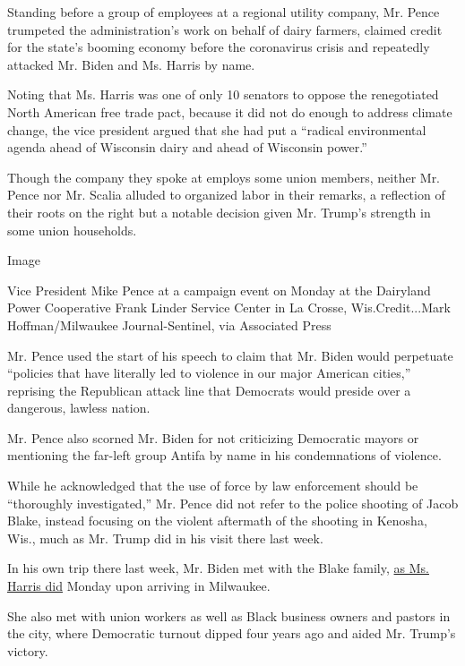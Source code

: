 Standing before a group of employees at a regional utility company, Mr.
Pence trumpeted the administration's work on behalf of dairy farmers,
claimed credit for the state's booming economy before the coronavirus
crisis and repeatedly attacked Mr. Biden and Ms. Harris by name.

Noting that Ms. Harris was one of only 10 senators to oppose the
renegotiated North American free trade pact, because it did not do
enough to address climate change, the vice president argued that she had
put a ``radical environmental agenda ahead of Wisconsin dairy and ahead
of Wisconsin power.''

Though the company they spoke at employs some union members, neither Mr.
Pence nor Mr. Scalia alluded to organized labor in their remarks, a
reflection of their roots on the right but a notable decision given Mr.
Trump's strength in some union households.

Image

Vice President Mike Pence at a campaign event on Monday at the Dairyland
Power Cooperative Frank Linder Service Center in La Crosse,
Wis.Credit...Mark Hoffman/Milwaukee Journal-Sentinel, via Associated
Press

Mr. Pence used the start of his speech to claim that Mr. Biden would
perpetuate ``policies that have literally led to violence in our major
American cities,'' reprising the Republican attack line that Democrats
would preside over a dangerous, lawless nation.

Mr. Pence also scorned Mr. Biden for not criticizing Democratic mayors
or mentioning the far-left group Antifa by name in his condemnations of
violence.

While he acknowledged that the use of force by law enforcement should be
``thoroughly investigated,'' Mr. Pence did not refer to the police
shooting of Jacob Blake, instead focusing on the violent aftermath of
the shooting in Kenosha, Wis., much as Mr. Trump did in his visit there
last week.

In his own trip there last week, Mr. Biden met with the Blake family,
\href{https://www.nytimes3xbfgragh.onion/live/2020/09/07/us/trump-vs-biden?action=click\&module=Top\%20Stories\&pgtype=Homepage\#in-her-first-stop-in-the-state-kamala-harris-met-privately-with-jacob-blakes-family}{as
Ms. Harris did} Monday upon arriving in Milwaukee.

She also met with union workers as well as Black business owners and
pastors in the city, where Democratic turnout dipped four years ago and
aided Mr. Trump's victory.

